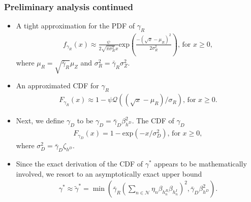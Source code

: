 \documentclass[article,mathserif,10pt,envcountsect]{beamer}
\newcommand{\Exp}[1]{\mathrm{exp}\left(#1\right)}
\begin{document}
\begin{frame}
	\frametitle{Preliminary analysis continued}
	\begin{itemize}
		\item  A  tight approximation for the PDF of $\gamma_R$ 
		\begin{eqnarray}\label{eqn:pdf_gamma_R}
		\!\!\!\!\! f_{\gamma_R}(x) \approx \frac{\psi}{2\sqrt{\pi \sigma_R^2}  x} \Exp{\frac{-(\sqrt{x}-\mu_R)^2}{2 \sigma_R^2}}, \,  \text{for}  \,\, x\geq 0, \nonumber
		\end{eqnarray}
		where $\mu_R= \sqrt{\bar{\gamma}_R} \mu_Z$ and $\sigma_{R}^2 =\bar{\gamma}_R \sigma_{Z}^2 $.
		
		\item An approximated CDF for $\gamma_R$  
		\vspace{-1mm}
		\begin{eqnarray}\label{eqn:cdf_gamma_R}
		F_{\gamma_R}(x) \approx 1- \psi \mathcal{Q}\left((\sqrt{x}-\mu_R)/\sigma_{R}\right),  \,  \text{for}  \,\, x\geq 0. \nonumber
		\end{eqnarray}
		
		\item Next, we define 	$\gamma_D$ to be  $\gamma_D = \bar{\gamma}_D \beta_{h^D}^2$. The CDF of $\gamma_D$ 
		\begin{eqnarray}\label{eqn:cdf_gamma_D}
		F_{\gamma_D}(x) = 1- \Exp{-x/\sigma_D^2},  \,  \text{for}  \,\, x\geq 0, \nonumber
		\end{eqnarray}
		where $\sigma_D^2=\bar{\gamma}_D \zeta_{h^D}$.
		
		\item Since the exact derivation of the CDF of $\gamma^*$ appears to be mathematically  involved, we resort to an asymptotically exact  upper bound 
		\begin{eqnarray}\label{eqn:gamma_upper}
		\gamma^* \approx \tilde{\gamma}^* =
		\min \left(\bar{\gamma}_R  \left(\sum\nolimits_{n \in \mathcal{N}} \eta_{n} \beta_{h_{n}^R}  \beta_{h_{n}^I} \right)^2,\bar{\gamma}_D \beta_{h^D}^2 \right). \nonumber
		\end{eqnarray}
	
		
	\end{itemize}
	
\end{frame}	
\end{document}
